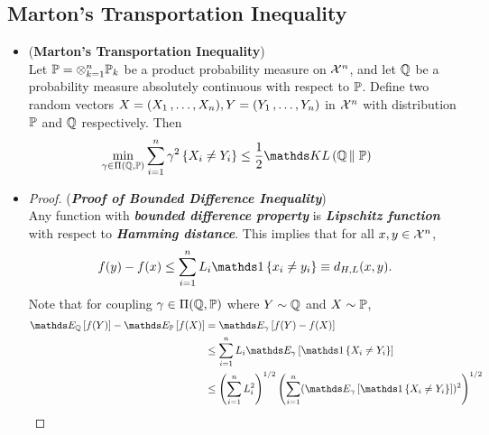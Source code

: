 \documentclass[11pt]{article}
\begin{document}
\subsection{Marton's Transportation Inequality}
\begin{itemize}
\item \begin{theorem} (\textbf{Marton's Transportation Inequality}) \citep{boucheron2013concentration}\\
Let ${\mathbb P} = \otimes_{k=1}^n {\mathbb P}_k$ be a product probability measure on ${\mathcal X}^n$, and let ${\mathbb Q}$ be a probability measure absolutely continuous with respect to ${\mathbb P}$. Define two random vectors $X = (X_1 \,{,}\ldots{,}\, X_n), Y = (Y_1 \,{,}\ldots{,}\, Y_n)$ in ${\mathcal X}^n$ with distribution ${\mathbb P}$ and ${\mathbb Q}$ respectively.  Then
\begin{align}
 \min_{\gamma \in \Pi(\bQ, \bP)}\sum_{i=1}^n \gamma^2\set{X_i \neq Y_i} &\le \frac{1}{2}\kl{\bQ}{\bP} \ \label{ineqn: marton_transport_cost_inequality} 
\end{align}
\end{theorem}

\item \begin{proof} (\textbf{\emph{Proof of Bounded Difference Inequality}}) \\
Any  function with \emph{\textbf{bounded difference property}} is \emph{\textbf{Lipschitz function}} with respect to \emph{\textbf{Hamming distance}}. This implies that for all $x, y \in {\mathcal X}^n$,
\begin{align*}
f(y) - f(x) \le \sum_{i=1}^{n}L_i \ind{x_i \neq y_i} \equiv d_{H,L}(x, y).
\end{align*} Note that for coupling $\gamma \in \Pi({\mathbb Q}, {\mathbb P})$ where $Y \sim {\mathbb Q}$ and $X \sim {\mathbb P}$, 
\begin{align*}
\E{\bQ}{f(Y)} - \E{\bP}{f(X)} &= \E{\gamma}{f(Y) - f(X)} \\
&\le \sum_{i=1}^n L_i \E{\gamma}{\ind{X_i \neq Y_i}} \\
&\le \paren{\sum_{i=1}^{n}L_i^2}^{1/2}\paren{\sum_{i=1}^{n}(\E{\gamma}{\ind{X_i \neq Y_i}})^2}^{1/2}
\end{align*}


\end{proof}
\end{itemize}
\end{document}
